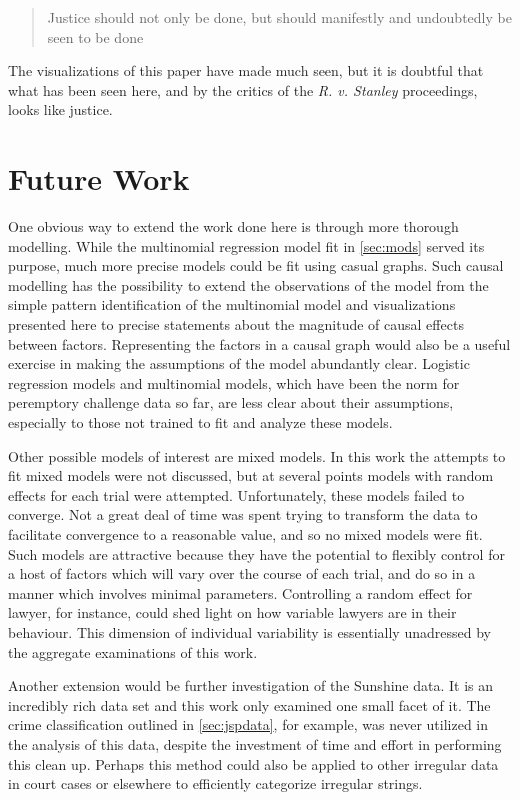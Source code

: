 \begin{quote}
  Justice should not only be done, but should manifestly and undoubtedly be seen to be done
\end{quote}

The visualizations of this paper have made much seen, but it is doubtful that what has been seen here, and by the critics of the
\textit{R. v. Stanley} proceedings, looks like justice.

\section{Future Work}
\label{sec:FutureWork}

One obvious way to extend the work done here is through more thorough modelling. While the multinomial regression model fit in
\ref{sec:mods} served its purpose, much more precise models could be fit using casual graphs. Such causal modelling has the
possibility to extend the observations of the model from the simple pattern identification of the multinomial model and
visualizations presented here to precise statements about the magnitude of causal effects between factors. Representing the
factors in a causal graph would also be a useful exercise in making the assumptions of the model abundantly clear. Logistic
regression models and multinomial models, which have been the norm for peremptory challenge data so far, are less clear about
their assumptions, especially to those not trained to fit and analyze these models.

Other possible models of interest are mixed models. In this work the attempts to fit mixed models were not discussed, but at
several points models with random effects for each trial were attempted. Unfortunately, these models failed to converge. Not a
great deal of time was spent trying to transform the data to facilitate convergence to a reasonable value, and so no mixed models
were fit. Such models are attractive because they have the potential to flexibly control for a host of factors which will vary
over the course of each trial, and do so in a manner which involves minimal parameters. Controlling a random effect for lawyer,
for instance, could shed light on how variable lawyers are in their behaviour. This dimension of individual variability is
essentially unadressed by the aggregate examinations of this work.

Another extension would be further investigation of the Sunshine data. It is an incredibly rich data set and this work only
examined one small facet of it. The crime classification outlined in \ref{sec:jspdata}, for example, was never utilized in the
analysis of this data, despite the investment of time and effort in performing this clean up. Perhaps this method could also be
applied to other irregular data in court cases or elsewhere to efficiently categorize irregular strings.


